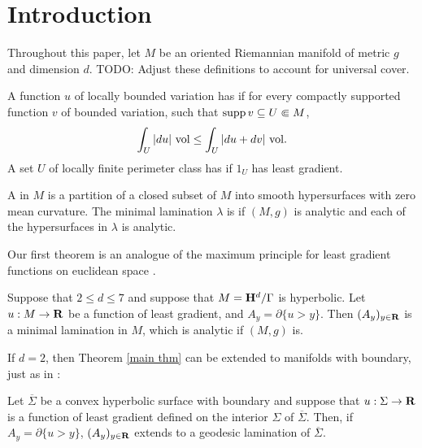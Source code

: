 \section{Introduction}
Throughout this paper, let $M$ be an oriented Riemannian manifold of metric $g$ and dimension $d$.
TODO: Adjust these definitions to account for universal cover.

\begin{definition}\label{main definitions}
A function $u$ of locally bounded variation has  if for every compactly supported function $v$ of bounded variation, such that $\operatorname{supp} v \subseteq U \Subset M$,
$$\int_U |du| ~\mathrm{vol} \leq \int_U |du + dv| ~\mathrm{vol}.$$
A set $U$ of locally finite perimeter class has  if $1_U$ has least gradient.
\end{definition}

\begin{definition}
A  in $M$ is a partition of a closed subset of $M$ into smooth hypersurfaces with zero mean curvature.
The minimal lamination $\lambda$ is  if $(M, g)$ is analytic and each of the hypersurfaces in $\lambda$ is analytic.
\end{definition}

Our first theorem is an analogue of the maximum principle for least gradient functions on euclidean space \cite[Proposition 3.4]{górny2017planar}.

\begin{theorem}\label{main thm}
Suppose that $2 \leq d \leq 7$ and suppose that $M = \mathbf H^d/\Gamma$ is hyperbolic. 
Let $u: M \to \mathbf{R}$ be a function of least gradient, and $A_y = \partial \{u > y\}$.
Then $(A_y)_{y \in \mathbf{R}}$ is a minimal lamination in $M$, which is analytic if $(M, g)$ is.
\end{theorem}

If $d = 2$, then Theorem \ref{main thm} can be extended to manifolds with boundary, just as in \cite[Corollary 3.5]{górny2017planar}:

\begin{theorem}\label{main crly}
Let $\overline \Sigma$ be a convex hyperbolic surface with boundary and suppose that $u: \Sigma \to \mathbf{R}$ is a function of least gradient defined on the interior $\Sigma$ of $\overline \Sigma$.
Then, if $A_y = \partial \{u > y\}$, $(A_y)_{y \in \mathbf{R}}$ extends to a geodesic lamination of $\overline \Sigma$.
\end{theorem}

